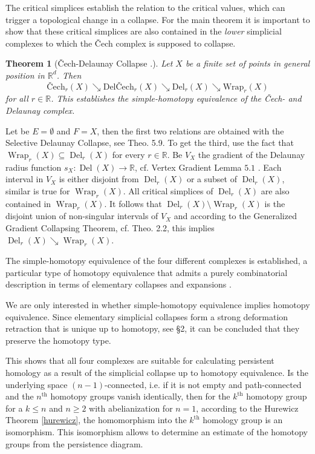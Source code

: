 \documentclass[journal]{IEEEtran}
\DeclareMathOperator{\Del}{Del}
\DeclareMathOperator{\Wrap}{Wrap}
\newtheorem{theorem}{Theorem}[section]
\begin{document}
The critical simplices establish the relation to the critical  values, which can trigger a topological change in a collapse. For the main theorem it is important to show that these critical simplices are also contained in the \textit{lower} simplicial complexes to which the \v{C}ech complex is supposed to collapse.

\begin{theorem}[\v{C}ech-Delaunay Collapse \cite{bauer2017morse}.] Let $X$ be a finite set of points in general position in $\mathbb{R}^d$. Then
\begin{equation}
\label{theo:collapse}
\text{\v{C}ech}_r(X) \searrow \text{Del\v{C}ech}_r(X) \searrow \text{Del}_r(X) \searrow \text{Wrap}_r(X)
\end{equation}
for all $r \in \mathbb{R}$. This establishes the simple-homotopy equivalence of the \v{C}ech- and Delaunay complex.
\end{theorem}

\begin{IEEEproof}
Let be $E = \emptyset$ and $F = X$, then the first two relations are obtained with the Selective Delaunay Collapse, see \cite{BauerE14} Theo. 5.9. To get the third, use
the fact that $\Wrap_r(X) \subseteq \Del_r(X)$ for every $r \in \mathbb{R}$. Be $V_X$ the gradient of the Delaunay radius function $s_X: \Del(X) \rightarrow \mathbb{R}$, cf. Vertex Gradient Lemma $5.1$ \cite{BauerE14}. Each interval in $V_X$ is either disjoint from $\Del_r(X)$ or a subset of $\Del_r(X)$, similar is true for $\Wrap_r(X)$. All critical simplices of $\Del_r(X)$ are also contained in $\Wrap_r(X)$. It follows that $\Del_r(X) \setminus \Wrap_r(X)$ is the disjoint union of non-singular intervals of $V_X$ and according to the Generalized Gradient Collapsing Theorem, cf. \cite{BauerE14} Theo. 2.2, this implies $\Del_r(X) \searrow \Wrap_r(X)$.
\end{IEEEproof}

The simple-homotopy equivalence of the four different complexes is established, a particular type of homotopy equivalence that admits a purely combinatorial description in terms of elementary collapses and expansions \cite{BauerE14, cohen2012course}.

We are only interested in whether simple-homotopy equivalence implies homotopy equivalence. Since elementary simplicial collapses form a strong deformation retraction that is unique up to homotopy, see \cite{cohen2012course} §2, it can be concluded that they preserve the homotopy type.

This shows that all four complexes are suitable for calculating persistent homology as a result of the simplicial collapse up to homotopy equivalence. Is the underlying space $(n-1)$-connected, i.e. if it is not empty and path-connected and the $n^{\text{th}}$ homotopy groups vanish identically, then for the $k^{\text{th}}$ homotopy group for a $k \leq n$ and $n \geq 2$ with abelianization for $n = 1$, according to the Hurewicz Theorem \ref{hurewicz}, the homomorphism into the $k^{\text{th}}$ homology group is an isomorphism. This isomorphism allows to determine an estimate of the homotopy groups from the persistence diagram.
\end{document}
